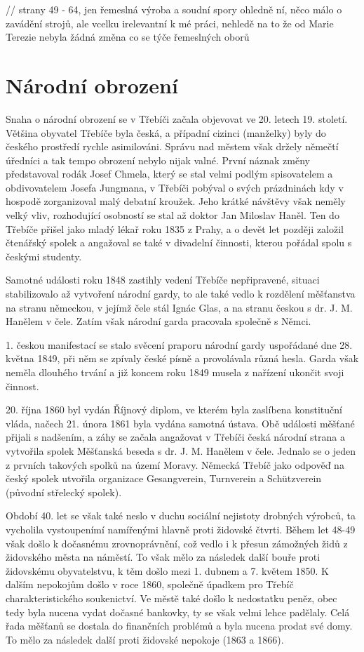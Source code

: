 \documentclass[a4paper,oneside,12p]{report}
\begin{document}
// strany 49 - 64, jen řemeslná výroba a soudní spory ohledně ní, něco málo o zavádění strojů, ale vcelku irelevantní k mé práci, nehledě na to že od Marie Terezie nebyla žádná změna co se týče řemeslných oborů

\section{Národní obrození}
Snaha o národní obrození se v Třebíči začala objevovat ve 20. letech 19. století.
Většina obyvatel Třebíče byla česká, a případní cizinci (manželky) byly do českého prostředí rychle asimilováni.
Správu nad městem však držely němečtí úředníci a tak tempo obrození nebylo nijak valné.
První náznak změny představoval rodák Josef Chmela, který se stal velmi podlým spisovatelem a obdivovatelem Josefa Jungmana, v Třebíči pobýval o svých prázdninách kdy v hospodě zorganizoval malý debatní kroužek.
Jeho krátké návštěvy však neměly velký vliv, rozhodující osobností se stal až doktor Jan Miloslav Haněl.
Ten do Třebíče přišel jako mladý lékař roku 1835 z Prahy, a o devět let později založil čtenářský spolek a angažoval se také v divadelní činnosti, kterou pořádal spolu s českými studenty. %

Samotné události roku 1848 zastihly vedení Třebíče nepřipravené, situaci stabilizovalo až vytvoření národní gardy, to ale také vedlo k rozdělení měšťanstva na stranu německou, v jejímž čele stál Ignác Glas, a na stranu českou s dr. J. M. Hanělem v čele.
Zatím však národní garda pracovala společně s Němci. %

1. českou manifestací se stalo svěcení praporu národní gardy uspořádané dne 28. května 1849, při něm se zpívaly české písně a provolávala různá hesla.
Garda však neměla dlouhého trvání a již koncem roku 1849 musela z nařízení ukončit svoji činnost. %

20. října 1860 byl vydán Říjnový diplom, ve kterém byla zaslíbena konstituční vláda, načech 21. února 1861 byla vydána samotná ústava.
Obě události měšťané přijali s nadšením, a záhy se začala angažovat v Třebíči česká národní strana a vytvořila spolek Měšťanská beseda s dr. J. M. Hanělem v čele.
Jednalo se o jeden z prvních takových spolků na území Moravy.
Německá Třebíč jako odpověď na český spolek utvořila organizace Gesangverein, Turnverein a Schützverein (původní střelecký spolek). %

Období 40. let se však také neslo v duchu sociální nejistoty drobných výrobců, ta vycholila vystoupenímí namířenými hlavně proti židovské čtvrti.
Během let 48-49 však došlo k dočasnému zrovnoprávnění, což vedlo i k přesun zámožných židů z židovského města na náměstí.
To však mělo za následek další bouře proti židovskému obyvatelstvu, k těm došlo mezi 1. dubnem a 7. květem 1850.
K dalším nepokojům došlo v roce 1860, společně úpadkem pro Třebíč charakteristického soukenictví.
Ve městě také došlo k nedostatku peněz, obec tedy byla nucena vydat dočasné bankovky, ty se však velmi lehce padělaly.
Celá řada měšťanů se dostala do finančních problémů a byla nucena prodat své domy.
To mělo za následek další proti židovské nepokoje (1863 a 1866). %
\end{document}
